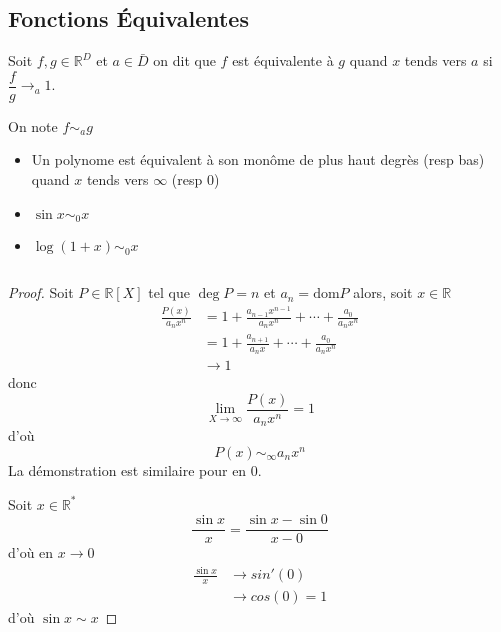 \documentclass[11pt,colorlinks]{book}
\theoremstyle{mytheoremstyle}
\theoremstyle{mytheoremstyle}
\theoremstyle{mytheoremstyle}
\theoremstyle{mytheoremstyle}
\theoremstyle{mytheoremstyle}
\theoremstyle{mytheoremstyle}
\theoremstyle{mytheoremstyle}
\theoremstyle{mytheoremstyle}
\theoremstyle{myproblemstyle}
\def\mbb#1{\mathbb{#1}}
\def\bR{\mbb{R}}
\renewcommand{\equiv}{\sim}
\begin{document}
    \subsection{Fonctions Équivalentes}
    \begin{definition}
      Soit $f,g \in \bR^{D}$ et $a \in \bar{D}$ on dit que $f$ est équivalente à $g$ 
      quand $x$ tends vers $a$ si $\dfrac{f}{g} \to_{a} 1$.  

      On note $f \equiv_a g$ 
    \end{definition}
    \begin{ex}
      \begin{itemize}
        \item Un polynome est équivalent à son monôme de plus haut degrès (resp bas) quand $x$ tends vers $\infty$ (resp $0$)
        \item $\sin x \equiv_{0} x$
        \item $\log(1+x) \equiv_{0} x$
      \end{itemize}
      $ $
      \begin{proof}

          Soit $P \in \bR[X]$ tel que $\deg P = n$ et $a_n = \text{dom} P$ alors, soit $x \in \bR$
          \begin{align*}
            \frac{P(x)}{a_n x^n} &= 1 + \frac{a_{n-1}x^{n-1}}{a_nx^n} + \cdots + \frac{a_0}{a_nx^n} \\ 
            &= 1 + \frac{a_{n+1}}{a_n x} + \cdots + \frac{a_0}{a_n x^n} \\ 
            &\to 1 
          \end{align*}
          donc 
          \begin{equation*}
            \lim_{X \to \infty} \frac{P(x)}{a_n x^n} = 1
          \end{equation*}
          d'où 
          \begin{equation*}
            P(x) \sim_{\infty} a_n x^n
          \end{equation*}
          La démonstration est similaire pour en 0.\newline


          Soit $x \in \bR^*$ 
          \begin{equation*}
            \frac{\sin x}{x} = \frac{\sin x - \sin 0}{x - 0}
          \end{equation*}
          d'où en $x \to 0$ 
          \begin{align*}
            \frac{\sin x}{x} &\to sin'(0) \\ 
            &\to cos(0) = 1
          \end{align*}
          d'où $\sin x \sim x$\newline



\end{proof}
\end{ex}
\end{document}

